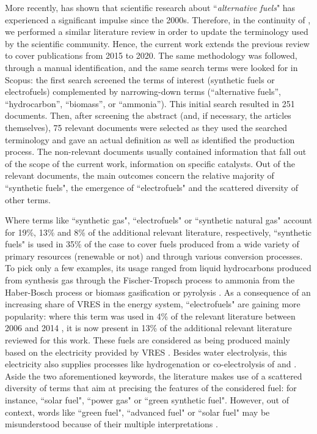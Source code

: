 More recently, \citet{Stancin2020} has shown that scientific research about ``\textit{alternative fuels}" has experienced a significant impulse since the 2000s. Therefore, in the continuity of \cite{ridjan2016}, we performed a similar literature review in order to update the terminology used by the scientific community. Hence, the current work extends the previous review to cover publications from 2015 to 2020. The same methodology was followed, through a manual identification, and the same search terms were looked for in Scopus: the first search screened the terms of interest (\ie synthetic fuels or electrofuels) complemented by narrowing-down terms (\eg “alternative fuels”, “hydrocarbon”, “biomass”, or “ammonia”). This initial search resulted in 251 documents. Then, after screening the abstract (and, if necessary, the articles themselves), 75 relevant documents were selected as they used the searched terminology and gave an actual definition as well as identified the production process. The non-relevant documents usually contained information that fall out of the scope of the current work, \eg information on specific catalysts. Out of the relevant documents, the main outcomes concern the relative majority of ``synthetic fuels", the emergence of ``electrofuels" and the scattered diversity of other terms. 

Where terms like ``synthetic gas", ``electrofuels" or ``synthetic natural gas" account for 19\%, 13\% and 8\% of the additional relevant literature, respectively, ``synthetic fuels" is used in 35\% of the case to cover fuels produced from a wide variety of primary resources (renewable or not) and through various conversion processes. To pick only a few examples, its usage ranged from liquid hydrocarbons produced from synthesis gas through the Fischer-Tropsch process \cite{haarlemmer2014,Trieb2018} to ammonia from the Haber-Bosch process \cite{bargiacchi2019} or biomass gasification or pyrolysis \cite{monaco2018, rao2015}. As a consequence of an increasing share of \gls{VRES} in the energy system, ``electrofuels" are gaining more popularity: where this term was used in 4\% of the relevant literature between 2006 and 2014 \cite{ridjan2016}, it is now present in 13\% of the additional relevant literature reviewed for this work. These fuels are considered as being produced mainly based on the electricity provided by \gls{VRES} \cite{brynolf2018}. Besides water electrolysis, this electricity also supplies processes like  hydrogenation \cite{brynolf2018,Decker2019,Pearson2012} or co-electrolysis of  and  \cite{hanggi2019,larsson2015}. Aside the two aforementioned keywords, the literature makes use of a scattered diversity of terms that aim at precising the features of the considered fuel: for instance, ``solar fuel", ``power gas" or ``green synthetic fuel". However, out of context, words like ``green fuel", ``advanced fuel" or ``solar fuel" may be misunderstood because of their multiple interpretations \cite{ridjan2016}.

